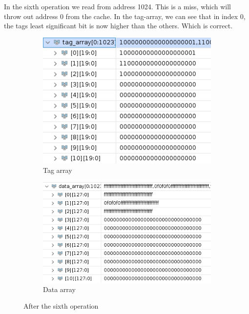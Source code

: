 \documentclass{article}
\begin{document}
In the sixth operation we read from address 1024. This is a miss, which will throw out address 0 from the cache. In the tag-array, we can see that in index 0, the tags least significant bit is now higher than the others. Which is correct.
\begin{figure}[H]
\centering
\begin{subfigure}{.5\textwidth}
  \centering
  \includegraphics[width=.8\linewidth]{img/tag4.png}
  \caption{Tag array}
\end{subfigure}%
\begin{subfigure}{.5\textwidth}
  \centering
  \includegraphics[width=.9\linewidth]{img/data4.png}
  \caption{Data array}
\end{subfigure}
\caption{After the sixth operation}
\end{figure}
\end{document}
